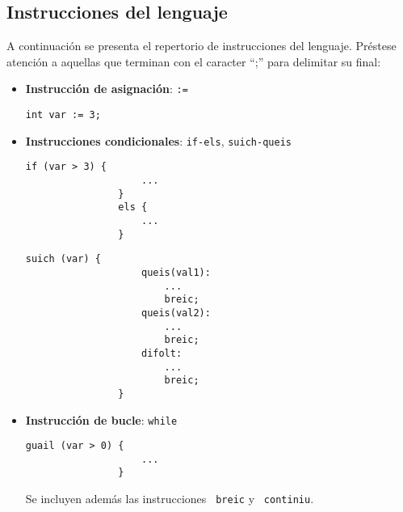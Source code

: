 \documentclass[10pt,a4paper]{article}
\begin{document}
\subsection{Instrucciones del lenguaje}
A continuación se presenta el repertorio de instrucciones del lenguaje. Préstese atención a aquellas que terminan con el caracter ``;'' para delimitar su final:
\begin{itemize}
    \item \textbf{Instrucción de asignación}: \texttt{:=}
    \begin{center}
        \begin{minipage}{\linewidth}
            \begin{lstlisting}[linewidth=0.3\linewidth, gobble=16]
                int var := 3;
            \end{lstlisting}
        \end{minipage}
    \end{center}
    
    \item \textbf{Instrucciones condicionales}: \texttt{if-els}, \texttt{suich-queis}
    \begin{center}
        \begin{minipage}{\linewidth}
            \begin{lstlisting}[linewidth=0.3\linewidth, gobble=16]
                if (var > 3) {
                    ...
                }
                els {
                    ...
                }
            \end{lstlisting}
        \end{minipage}
    \end{center}
    \begin{center}
        \begin{minipage}{\linewidth}
            \begin{lstlisting}[linewidth=0.3\linewidth, gobble=16]
                suich (var) {
                    queis(val1):
                        ...
                        breic;
                    queis(val2):
                        ...
                        breic;
                    difolt:
                        ...
                        breic;
                }
            \end{lstlisting}
        \end{minipage}
    \end{center}

    \item \textbf{Instrucción de bucle}: \texttt{while}
    \begin{center}
        \begin{minipage}{\linewidth}
            \begin{lstlisting}[linewidth=0.3\linewidth, gobble=16]
                guail (var > 0) {
                    ...
                }
            \end{lstlisting}
        \end{minipage}
    \end{center}
    Se incluyen además las instrucciones \texttt{\color{blue} breic} y \texttt{\color{blue} continiu}.


\end{itemize}
\end{document}
